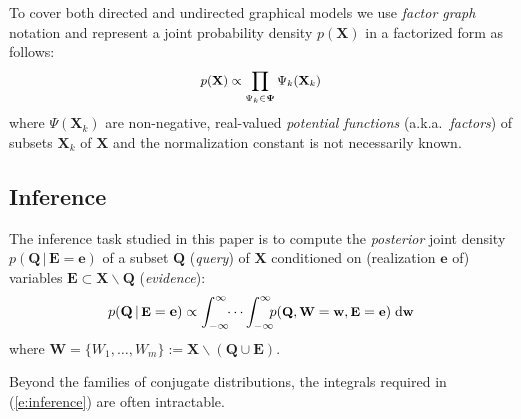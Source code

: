 \documentclass[]{article}
\renewcommand{\vec}[1]{\mathbf{#1}}
\newcommand{\bvec}[1]{\textbf{#1}}
\newcommand{\pr}{p}
\newcommand{\dd}{\;\mathrm{d}} %
\begin{document}
To cover both directed and undirected graphical models we use
\emph{factor graph} notation \citep{kschischang2001factor}
and represent a joint probability density $\pr(\vec{X})$ in a factorized form as follows: 
\begin{equation} \footnotesize
\label{e:factor-graph}
\pr(\vec{X}) \propto \prod_{\Psi_k \in \boldsymbol\Psi} \Psi_k (\vec{X}_k)
\end{equation}
where 
$\Psi(\vec{X}_k)$ are non-negative, real-valued \emph{potential functions} 
(a.k.a.\ \emph{factors}) of subsets $\bvec{X}_k$ of $\bvec{X}$ 
 and the normalization constant is not necessarily known.

\subsection{Inference}
The inference task studied in this paper is to compute the \emph{posterior} joint density 
$\pr(\bvec{Q} \,|\, \bvec{E}=\bvec{e})$
of 
a subset $\bvec{Q}$ (\emph{query}) of $\bvec{X}$ 
conditioned on (realization $\bvec{e}$ of) 
variables  
$\bvec{E} \subset\bvec{X} \backslash \bvec{Q}$ (\emph{evidence}):
\begin{equation}\vspace{-0.5mm}\footnotesize
\label{e:inference}
\pr(\vec{Q} \,|\, \bvec{E} =\vec{e}) \propto 
\int_{-\infty}^{\infty} \!\! \cdots \int_{-\infty}^{\infty}
\!\!\! \pr(\bvec{Q}, \bvec{W} = \bvec{w}, \bvec{E}=\bvec{e} )
 \dd \bvec{w}
\end{equation}
where $\bvec{W} = \{W_1, \ldots, W_m\} := \vec{X} \backslash (\vec{Q} \cup \vec{E})$. %

Beyond the families of conjugate distributions, the integrals required in 
(\ref{e:inference}) 
are often intractable. 

\end{document}
